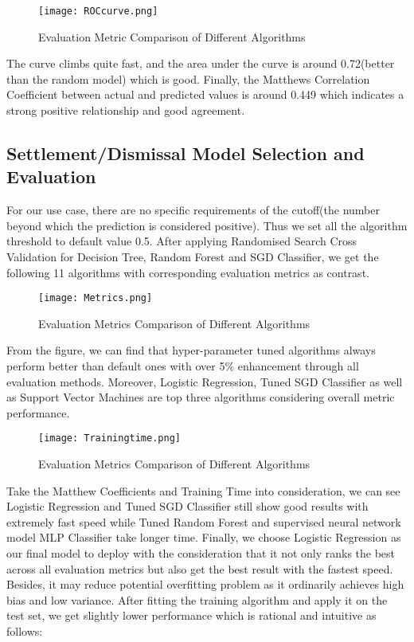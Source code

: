 \begin{figure}[H]
  \centering
  \texttt{[image: ROCcurve.png]}
  \caption{Evaluation Metric Comparison of Different Algorithms}
\end{figure}
The curve climbs quite fast, and the area under the curve is around 0.72(better than the random model) which is good. Finally, the Matthews Correlation Coefficient between actual and predicted values is around 0.449 which indicates a strong positive relationship and good agreement. 

 
\subsection{Settlement/Dismissal Model Selection and Evaluation}
For our use case, there are no specific requirements of the cutoff(the number beyond which the prediction is considered positive). Thus we set all the algorithm threshold to default value 0.5. After applying Randomised Search Cross Validation for Decision Tree, Random Forest and SGD Classifier, we get the following 11 algorithms with corresponding evaluation metrics as contrast. 
\begin{figure}[H]
  \centering
  \texttt{[image: Metrics.png]}
  \caption{Evaluation Metrics Comparison of Different Algorithms}
\end{figure}
From the figure, we can find that hyper-parameter tuned algorithms always perform better than default ones with over 5\% enhancement through all evaluation methods. Moreover, Logistic Regression, Tuned SGD Classifier as well as Support Vector Machines are top three algorithms considering overall metric performance. 
\begin{figure}[H]
  \centering
  \texttt{[image: Trainingtime.png]}
  \caption{Evaluation Metrics Comparison of Different Algorithms}
\end{figure}
Take the Matthew Coefficients and Training Time into consideration, we can see Logistic Regression and Tuned SGD Classifier still show good results with extremely fast speed while Tuned Random Forest and supervised neural network model MLP Classifier take longer time. Finally, we choose Logistic Regression as our final model to deploy with the consideration that it not only ranks the best across all evaluation metrics but also get the best result with the fastest speed. Besides, it may reduce potential overfitting problem as it ordinarily achieves high bias and low variance. After fitting the training algorithm and apply it on the test set, we get slightly lower performance which is rational and intuitive as follows:
